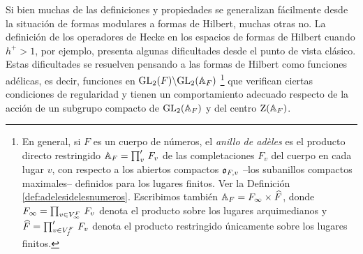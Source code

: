 Si bien muchas de las definiciones y propiedades se generalizan f\'{a}cilmente
desde la situaci\'{o}n de formas modulares a formas de Hilbert, muchas otras
no. La definici\'{o}n de los operadores de Hecke en los espacios de formas de
Hilbert cuando $h^{+}>1$, por ejemplo, presenta algunas dificultades desde el
punto de vista cl\'{a}sico. Estas dificultades se resuelven pensando a las
formas de Hilbert como funciones ad\'{e}licas, es decir, funciones en
$\GL_{2}(F)\backslash\GL_{2}(\adeles{F})$%
\footnote{
	En general, si $F$ es un cuerpo de n\'{u}meros, el \emph{anillo de %
	ad\`{e}les} es el producto directo restringido
	$\adeles{F}=\prod_{v}'\,F_{v}$ de las completaciones $F_{v}$ del cuerpo
	en cada lugar $v$, con respecto a los abiertos compactos $\oka{F,v}$
	--los subanillos compactos maximales-- definidos para los lugares
	finitos. Ver la Definici\'{o}n \ref{def:adelesidelesnumeros}.
	Escribimos tambi\'{e}n $\adeles{F}=\Adinf{F}\times\Adfin{F}$, donde
	$\Adinf{F}=\prod_{v\in\lugares[\infty]{F}}\,F_{v}$ denota el producto
	sobre los lugares arquimedianos y
	$\Adfin{F}=\prod_{v\in\lugares[f]{F}}'\,F_{v}$  denota el producto
	restringido \'{u}nicamente sobre los lugares finitos.
}
que verifican ciertas condiciones de regularidad y tienen un comportamiento
adecuado respecto de la acci\'{o}n de un subgrupo compacto de
$\GL_{2}(\adeles{F})$ y del centro $\centre(\adeles{F})$.

